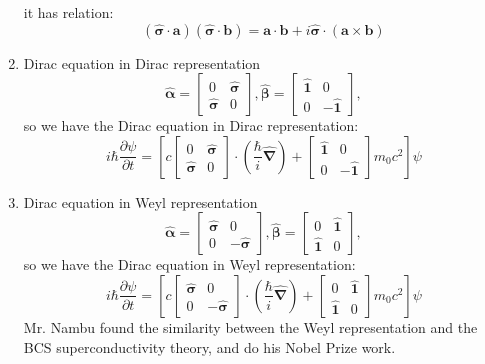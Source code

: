 \documentclass[12pt]{article}
\numberwithin{equation}{section}
\begin{document}
\begin{enumerate}
\begin{equation}
	\end{equation}
	it has relation:
	\begin{equation}
		(\hat{\bm{\sigma}}\cdot\mathbf{a})(\hat{\bm{\sigma}}\cdot\mathbf{b})
		=\mathbf{a}\cdot\mathbf{b}+i\hat{\bm{\sigma}}\cdot(\mathbf{a}\times\mathbf{b})
	\end{equation}
\item Dirac equation in Dirac representation
	\begin{equation}
		\hat{\mathbf{\alpha}}=\begin{bmatrix}0&\hat{\bm{\sigma}}\\\hat{\bm{\sigma}}&0\end{bmatrix},
		\hat{\bm{\beta}}=\begin{bmatrix}\hat{\mathbf{1}}&0\\0&-\hat{\mathbf{1}}\end{bmatrix},
	\end{equation}
	so we have the Dirac equation in Dirac representation:
	\begin{equation}
		i\hbar\frac{\partial \psi}{\partial t}=
		[c\begin{bmatrix}0&\hat{\bm{\sigma}}\\\hat{\bm{\sigma}}&0\end{bmatrix}\cdot(\frac{\hbar}{i}		\hat{\bm{\nabla}})+\begin{bmatrix}\hat{\mathbf{1}}&0\\0&-\hat{\mathbf{1}}\end{bmatrix}m_0c^2]\psi
	\end{equation}
\item Dirac equation in Weyl representation
	\begin{equation}
		\hat{\mathbf{\alpha}}=\begin{bmatrix}\hat{\bm{\sigma}}&0\\0&-\hat{\bm{\sigma}}\end{bmatrix},
		\hat{\mathbf{\beta}}=\begin{bmatrix}0&\hat{\mathbf{1}}\\\hat{\mathbf{1}}&0\end{bmatrix},
	\end{equation}
	so we have the Dirac equation in Weyl representation:
	\begin{equation}
		i\hbar\frac{\partial \psi}{\partial t}=
		[c\begin{bmatrix}\hat{\bm{\sigma}}&0\\0&-\hat{\bm{\sigma}}\end{bmatrix}\cdot(\frac{\hbar}{i}		\hat{\bm{\nabla}})+\begin{bmatrix}0&\hat{\mathbf{1}}\\\hat{\mathbf{1}}&0\end{bmatrix}m_0c^2]\psi
	\end{equation}
	Mr. Nambu found the similarity between the Weyl representation and the BCS superconductivity theory, and do his Nobel Prize work.
\end{enumerate}
\end{document}
